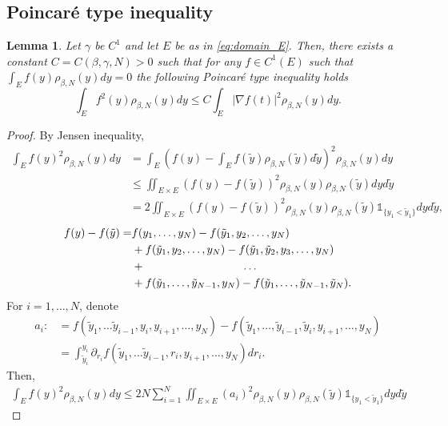 \documentclass[11pt]{article}
\numberwithin{equation}{section}
\newtheorem{lemma}[theorem]{Lemma}
\theoremstyle{definition}
\begin{document}
\subsection{Poincaré type inequality}
\begin{lemma}\label{lem::Poincare_inequality} Let $\gamma$ be $C^{1}$ and let $E$ be as in \eqref{eq:domain_E}. Then, there exists a constant $C = C(\beta, \gamma, N)>0$ such that for any $f\in C^{1}(E)$ such that $\int_{E}f(y)\rho_{\beta,N}(y)dy=0$ the following Poincaré type inequality holds
\[
    \int_{E}f^{2}(y)\rho_{\beta,N}(y)dy \le C \int_{E} \left|\nabla f(t)\right|^{2}\rho_{\beta,N}(y)dy.
\]
\end{lemma}
\begin{proof}
By Jensen inequality, 
\begin{align*}
    \int_{E}f(y)^{2}\rho_{\beta,N}(y)dy 
    &= \int_{E}\left(f(y)- \int_{E}f(\tilde y)\rho_{\beta,N}(\tilde y)d\tilde y\right)^{2}\rho_{\beta,N}(y)dy\\
    &\le \iint_{E\times E}(f(y)-f(\tilde y))^{2}\rho_{\beta,N}(y)\rho_{\beta,N}(\tilde y)dyd\tilde y\\
    & = 2\iint_{E\times E}(f(y)-f(\tilde y))^{2}\rho_{\beta,N}(y)\rho_{\beta,N}(\tilde y)\mathds{1}_{\{y_{1} < \tilde  y_{1}\}}dyd\tilde y,
\end{align*}
\begin{align*}
    f(y)-f(\tilde y) 
    =& f(y_{1}, \dots, y_{N}) - f(\tilde y_{1}, y_{2},\dots,y_{N})\\
    &+ f(\tilde y_{1}, y_{2},\dots,y_{N}) - f(\tilde y_{1}, \tilde y_{2}, y_{3}, \dots,y_{N})\\
    &+\hspace{3.1cm}\dots\\
    &+ f(\tilde y_{1},\dots, \tilde y_{N-1},y_{N})-f(\tilde y_{1},\dots, \tilde y_{N-1},\tilde y_{N}).
\end{align*}
For $i=1,\dots, N$, denote
\begin{align*}
    a_{i}
    :&=f(\tilde y_{1},\dots \tilde y_{i-1},  y_{i}, y_{i+1}, \dots, y_{N}) - f(\tilde y_{1},\dots,  \tilde y_{i-1}, \tilde y_{i}, y_{i+1}, \dots, y_{N}) \\
    &= \int_{\tilde y_{i}}^{y_{i}} \partial_{r_{i}}f(\tilde y_{1},\dots \tilde y_{i-1},  r_{i}, y_{i+1}, \dots, y_{N}) dr_{i}.
\end{align*}
Then, 
\begin{align*}
    \int_{E}f(y)^{2}\rho_{\beta,N}(y)dy  
    \le  2 N \sum_{i=1}^{N}\iint_{E\times E}(a_{i})^{2}\rho_{\beta,N}(y)\rho_{\beta,N}(\tilde y)\mathds{1}_{\{y_{1} < \tilde  y_{1}\}}dyd\tilde y

\end{align*}
\end{proof}
\end{document}
